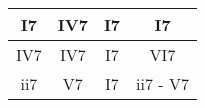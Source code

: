 
\begin{tabular}{| c | c | c | c |}
		\hline
		\phantom{x}I7\phantom{x} & \phantom{x}IV7\phantom{x} & \phantom{x}I7\phantom{x} & \phantom{x}I7\phantom{x}  \\
		\hline
		\phantom{x}IV7\phantom{x} & \phantom{x}IV7\phantom{x} & \phantom{x}I7\phantom{x} & \phantom{x}VI7\phantom{x}  \\
		\hline
		\phantom{x}ii7\phantom{x} & \phantom{x}V7\phantom{x} & \phantom{x}I7\phantom{x}   & ii7 - V7  \\
		\hline
\end{tabular}




